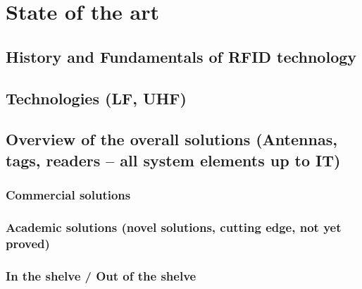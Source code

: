 \chapter{State of the art}

\section{History and Fundamentals of RFID technology}

\section{Technologies (LF, UHF)}

\section{Overview of the overall solutions (Antennas, tags, readers -- all system elements up to IT)}

\subsection{Commercial solutions}

\subsection{Academic solutions (novel solutions, cutting edge, not yet proved)}

\subsection{In the shelve / Out of the shelve}